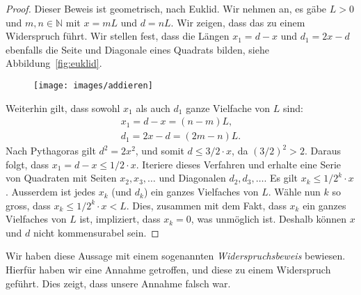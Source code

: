 \documentclass[../main.tex]{subfiles}
\begin{document}
\begin{proof}
  Dieser Beweis ist geometrisch, nach Euklid. Wir nehmen an, es gäbe $L > 0$ und
  $m,n \in \mathbb N$ mit $x = mL$ und $d = nL$. Wir zeigen, dass das zu einem Widerspruch
  führt.
  Wir stellen fest, dass die Längen $x_{1} = d-x$ und $d_{1} = 2x - d$
  ebenfalls die Seite und Diagonale eines Quadrats bilden, siehe
  Abbildung~\ref{fig:euklid}.

  \begin{figure}[htb]
    \centering
    \begin{minipage}{0.4\linewidth}
      \centering
      \texttt{[image: images/addieren]}
    \end{minipage}%
  \end{figure}

  Weiterhin gilt, dass sowohl $x_{1}$ als auch $d_{1}$ ganze Vielfache von $L$ sind:
  \begin{align*}
    x_{1} = d-x = (n-m)L, \\
    d_{1} = 2x-d = (2m -n)L.
  \end{align*}
  Nach Pythagoras gilt $d^{2} = 2x^{2}$, und somit $d \leq 3/2\cdot x$, da ${(3/2)}^{2} > 2$.
  Daraus folgt, dass
  \(x_{1} = d - x \leq 1/2 \cdot x\).
  Iteriere dieses Verfahren und erhalte eine Serie von Quadraten mit Seiten
  $x_{2}, x_{3}, \dots$ und Diagonalen $d_{2}, d_{3}, \dots$. Es gilt
  \(x_{k} \leq 1/2^k \cdot x\).
  Ausserdem ist jedes $x_{k}$ (und $d_{k}$) ein ganzes Vielfaches von $L$.
  Wähle nun $k$ so gross, dass
   \(x_{k} \leq 1/2^{k}\cdot x < L\).
   Dies, zusammen mit dem Fakt, dass
   $x_{k}$ ein ganzes Vielfaches von $L$ ist,
   impliziert, dass $x_{k} = 0$, was unmöglich ist. Deshalb können $x$ und $d$
   nicht kommensurabel sein.
\end{proof}

Wir haben diese Aussage mit einem sogenannten \emph{Widerspruchsbeweis} bewiesen.
Hierfür haben wir eine Annahme getroffen, und diese zu einem Widerspruch geführt.
Dies zeigt, dass unsere Annahme falsch war.
\end{document}

